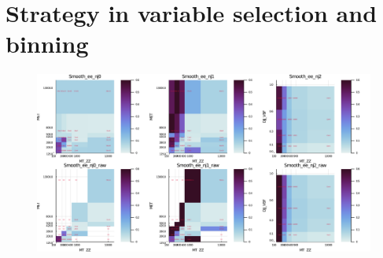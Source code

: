 \section{Strategy in variable selection and binning}
\begin{figure}[htb]
\begin{center}
\includegraphics[width=.90\linewidth]{fig/binning_placeholder.png}
\end{center}
\label{fig:sig_rewgt}
\end{figure}
